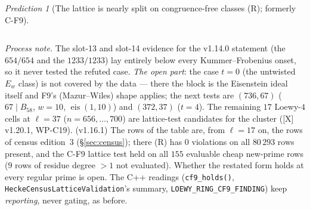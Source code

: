 \documentclass[11pt]{article}
\theoremstyle{remark}
\newtheorem{prediction}[theorem]{Prediction}
\begin{document}
\begin{prediction}[The lattice is nearly split on congruence-free classes (R); formerly C-F9]
\begin{center}
\begin{tabular}{@{}>{\raggedright\arraybackslash}p{3.3cm}>{\raggedright\arraybackslash}p{2.2cm}>{\raggedright\arraybackslash}p{2.2cm}>{\raggedright\arraybackslash}p{2.4cm}>{\raggedright\arraybackslash}p{4.3cm}@{}}
\bottomrule
\end{tabular}
\end{center}
\emph{Process note.} The slot-13 and slot-14 evidence for the v1.14.0 statement (the $654/654$ and the $1233/1233$) lay entirely
below every Kummer--Frobenius onset, so it never tested the refuted case. \emph{The open part}: the case $t=0$ (the untwisted
$E_w$ class) is not covered by the data --- there the block is the Eisenstein ideal itself and F9's (Mazur--Wiles) shape applies;
the next tests are $(736,67)$ ($67\mid B_{58}$, $w=10$, $\operatorname{eis}(1,10)$) and $(372,37)$ ($t=4$). The remaining $17$
Loewy-$4$ cells at $\ell=37$ ($n=656,\dots,700$) are lattice-test candidates for the cluster ([X] v1.20.1, WP-C19). (v1.16.1) The rows of the table are, from $\ell=17$ on, the rows of census edition~3 (\S\ref{sec:census}); there (R) has
$0$ violations on all $80\,293$ rows present, and the C-F9 lattice test held on all $155$ evaluable cheap new-prime rows ($9$ rows of
residue degree $>1$ not evaluated). Whether the
restated form holds at every regular prime is open. The C++ readings (\texttt{cf9\_holds()},
\texttt{HeckeCensusLatticeValidation}'s summary, \texttt{LOEWY\_RING\_CF9\_FINDING}) keep \emph{reporting}, never gating, as before.


\end{prediction}
\end{document}
